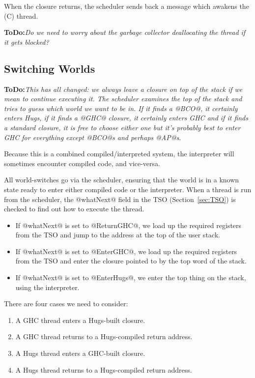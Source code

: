 \documentclass[11pt]{article}
\newcommand{\ToDo}[1]{{{\bf ToDo:}\sl #1}}
\newcommand{\secref}[1]{Section~\ref{sec:#1}}
\newcommand{\Subsection}[2]{\subsection{#1}\label{sec:#2}}
\begin{document}
When the closure returns, the scheduler sends back a message which
awakens the (C) thread.  

\ToDo{Do we need to worry about the garbage collector deallocating the
thread if it gets blocked?}

\Subsection{Switching Worlds}{switching-worlds}

\ToDo{This has all changed: we always leave a closure on top of the
stack if we mean to continue executing it.  The scheduler examines the
top of the stack and tries to guess which world we want to be in.  If
it finds a @BCO@, it certainly enters Hugs, if it finds a @GHC@
closure, it certainly enters GHC and if it finds a standard closure,
it is free to choose either one but it's probably best to enter GHC
for everything except @BCO@s and perhaps @AP@s.}

Because this is a combined compiled/interpreted system, the
interpreter will sometimes encounter compiled code, and vice-versa.

All world-switches go via the scheduler, ensuring that the world is in
a known state ready to enter either compiled code or the interpreter.
When a thread is run from the scheduler, the @whatNext@ field in the
TSO (\secref{TSO}) is checked to find out how to execute the
thread.

\begin{itemize}
\item If @whatNext@ is set to @ReturnGHC@, we load up the required
registers from the TSO and jump to the address at the top of the user
stack.
\item If @whatNext@ is set to @EnterGHC@, we load up the required
registers from the TSO and enter the closure pointed to by the top
word of the stack.
\item If @whatNext@ is set to @EnterHugs@, we enter the top thing on
the stack, using the interpreter.
\end{itemize}

There are four cases we need to consider:

\begin{enumerate}
\item A GHC thread enters a Hugs-built closure.
\item A GHC thread returns to a Hugs-compiled return address.
\item A Hugs thread enters a GHC-built closure.
\item A Hugs thread returns to a Hugs-compiled return address.
\end{enumerate}
\end{document}
